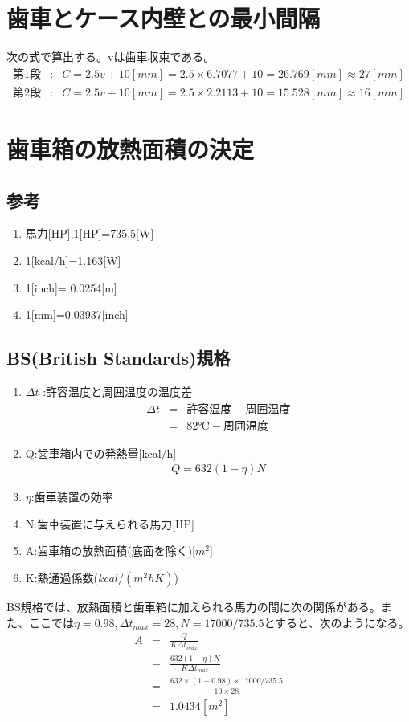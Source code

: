 \documentclass[a4j,twoside,openright,11pt]{jreport}
\begin{document}
\section{歯車とケース内壁との最小間隔}
次の式で算出する。vは歯車収束である。
\begin{eqnarray}
第1段&:&C=2.5v+10[mm] =2.5 \times 6.7077 + 10 = 26.769[mm]  \approx 27[mm]\\
第2段&:&C=2.5v+10[mm] =2.5 \times 2.2113 + 10 = 15.528[mm] \approx 16[mm]
\end{eqnarray}
\section{歯車箱の放熱面積の決定}
\subsection{参考}
\begin{enumerate}
\item 馬力[HP],1[HP]=735.5[W]
\item 1[kcal/h]=1.163[W]
\item 1[inch]= 0.0254[m]
\item 1[mm]=0.03937[inch]
\end{enumerate}
\subsection{BS(British Standards)規格}
\begin{enumerate}
\item $\Delta t$ :許容温度と周囲温度の温度差
\begin{eqnarray}
\Delta t &=&  許容温度 - 周囲温度\\
         &=&  82℃ - 周囲温度
\end{eqnarray}
\item Q:歯車箱内での発熱量[kcal/h]
\begin{eqnarray}
Q=632(1-\eta)N
\end{eqnarray}
\item $\eta$:歯車装置の効率
\item N:歯車装置に与えられる馬力[HP]
\item A:歯車箱の放熱面積(底面を除く)[$m^2$]
\item K:熱通過係数($kcal/(m^2hK)$)
\end{enumerate}
BS規格では、放熱面積と歯車箱に加えられる馬力の間に次の関係がある。また、ここでは$\eta=0.98,\Delta t_{max} = 28,N=17000/735.5$とすると、次のようになる。
\begin{eqnarray}
A&=&\frac{Q}{K\Delta t_{max}}\\
 &=&\frac{632(1-\eta)N}{K\Delta t_{max}}\\
 &=&\frac{632\times(1-0.98) \times 17000/735.5}{10 \times 28}\\
 &=&1.0434[m^2]
\end{eqnarray}
\end{document}
